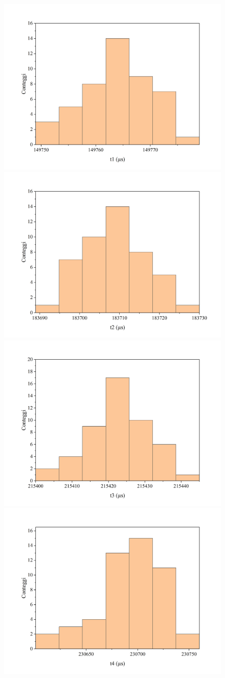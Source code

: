 \documentclass{article}
\begin{document}
\begin{figure}[H]
    \includegraphics[trim={2cm .5cm 2.4cm 2.1cm},clip,width=.5\textwidth]{t1.jpg}
    \includegraphics[trim={2cm .5cm 2.4cm 2.1cm},clip,width=.5\textwidth]{t2.jpg}
    \\
    \includegraphics[trim={2cm .5cm 2.4cm 2.1cm},clip,width=.5\textwidth]{t3.jpg}
    \includegraphics[trim={2cm .5cm 2.4cm 2.1cm},clip,width=.5\textwidth]{t4.jpg}
\end{figure}
\end{document}
